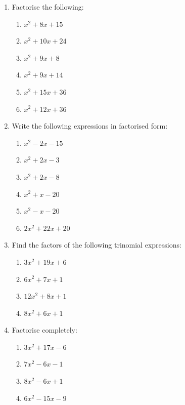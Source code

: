 \begin{exercises}{}
{
\begin{enumerate}[itemsep=5pt, label=\textbf{\arabic*}. ] 
\item Factorise the following:
\begin{multicols}{2}
\begin{enumerate}[itemsep=5pt, label=\textbf{(\alph*)} ] 
\item ${x}^{2}+8x+15$
\item ${x}^{2}+10x+24$
\item ${x}^{2}+9x+8$
\item ${x}^{2}+9x+14$
\item ${x}^{2}+15x+36$
\item ${x}^{2}+12x+36$
\end{enumerate}
\end{multicols}


\item Write the following expressions in factorised form:
\begin{multicols}{2}
\begin{enumerate}[itemsep=5pt, label=\textbf{(\alph*)} ]  
\item ${x}^{2}-2x-15$
\item ${x}^{2}+2x-3$
\item ${x}^{2}+2x-8$
\item ${x}^{2}+x-20$
\item ${x}^{2}-x-20$
\item $2{x}^{2}+22x+20$
\end{enumerate}
\end{multicols}


\item Find the factors of the following trinomial expressions:
\begin{multicols}{2}
\begin{enumerate}[itemsep=5pt, label=\textbf{(\alph*)} ] 

\item $3{x}^{2}+19x+6$
\item $6{x}^{2}+7x+1$
\item $12{x}^{2}+8x+1$
\item $8{x}^{2}+6x+1$
\end{enumerate}
\end{multicols}

\item Factorise completely:
\begin{multicols}{2}
\begin{enumerate}[itemsep=5pt, label=\textbf{(\alph*)} ] 
\item $3{x}^{2}+17x-6$
\item $7{x}^{2}-6x-1$
\item $8{x}^{2}-6x+1$
\item $6{x}^{2}-15x-9$
\end{enumerate}
\end{multicols}


\end{enumerate}}
\end{exercises}
